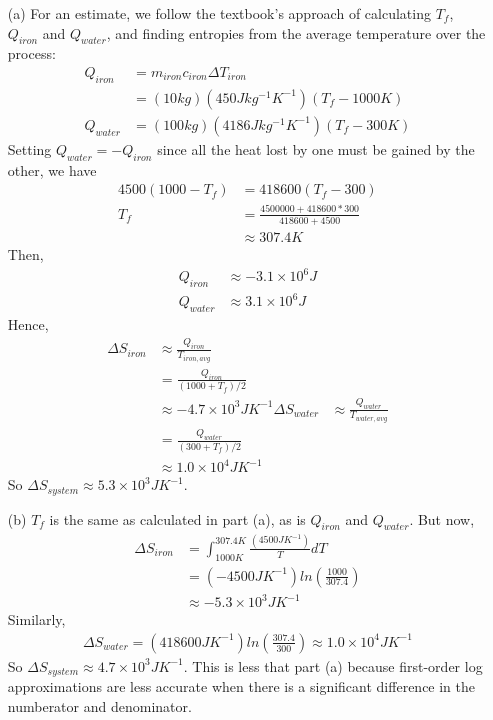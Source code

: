 \documentclass{article}
\begin{document}
\begin{itemize}
	\item[(a)] For an estimate, we follow the textbook's approach of calculating $T_f$, $Q_{iron}$ and $Q_{water}$, and finding entropies from the average temperature over the process:
	\begin{align*}
	Q_{iron} &= m_{iron}c_{iron}\Delta T_{iron} \\
	&= (10 kg)(450 J kg^{-1}K^{-1})(T_f-1000 K) \\
	Q_{water} &= (100 kg)(4186 J kg^{-1}K^{-1})(T_f-300 K)
	\end{align*}
	Setting $Q_{water} = - Q_{iron}$ since all the heat lost by one must be gained by the other, we have
	\begin{align*}
	4500(1000 - T_f) &= 418600(T_f-300) \\
	T_f &= \frac{4500000 + 418600*300}{418600 + 4500} \\
	&\approx 307.4 K
	\end{align*}
	Then,
	\begin{align*}
	Q_{iron} &\approx -3.1\times10^6 J \\
	Q_{water} &\approx 3.1\times10^6 J
	\end{align*}
	Hence,
	\begin{align*}
	\Delta S_{iron} &\approx \frac{Q_{iron}}{T_{iron,avg}} \\
	&= \frac{Q_{iron}}{(1000+T_f)/2} \\
	&\approx -4.7\times10^3 J K^{-1}
	\Delta S_{water} &\approx \frac{Q_{water}}{T_{water,avg}} \\
	&= \frac{Q_{water}}{(300+T_f)/2} \\
	&\approx 1.0\times10^4 J K^{-1}
	\end{align*}
	So $\Delta S_{system} \approx 5.3\times10^3 J K^{-1}$.
	\item[(b)] $T_f$ is the same as calculated in part (a), as is $Q_{iron}$ and $Q_{water}$. But now,
	\begin{align*}
	\Delta S_{iron} &= \int_{1000 K}^{307.4 K}\frac{(4500 JK^{-1})}{T}dT \\
	&= (-4500 JK^{-1})ln\left(\frac{1000}{307.4}\right) \\
	&\approx -5.3\times10^3 JK^{-1}
	\end{align*}
	Similarly,
	\begin{align*}
	\Delta S_{water} = (418600 JK^{-1})ln\left(\frac{307.4}{300}\right) \approx 1.0\times10^4 JK^{-1}
	\end{align*}
	So $\Delta S_{system} \approx 4.7\times10^3 JK^{-1}$. This is less that part (a) because first-order log approximations are less accurate when there is a significant difference in the numberator and denominator.
\end{itemize}
\end{document}
